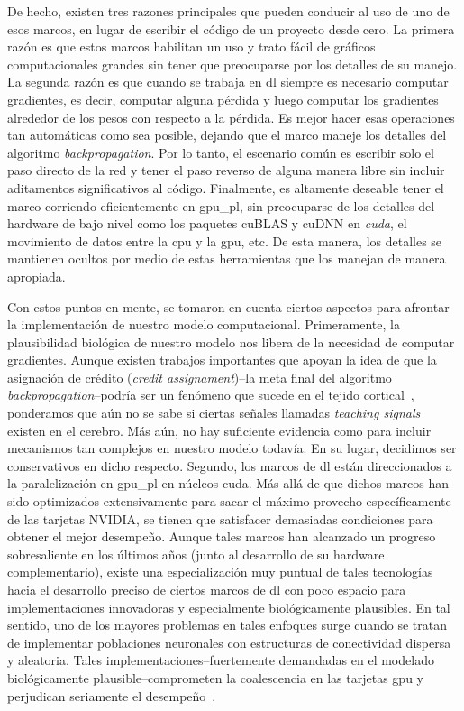{De hecho, existen tres razones principales que pueden conducir al uso de uno de esos marcos, en lugar de escribir el código de un proyecto desde cero.
La primera razón es que estos marcos habilitan un uso y trato fácil de gráficos computacionales grandes sin tener que preocuparse por los detalles de su manejo.
La segunda razón es que cuando se trabaja en \gls{dl} siempre es necesario computar gradientes, es decir, computar alguna pérdida y luego computar los gradientes alrededor de los pesos con respecto a la pérdida.
Es mejor hacer esas operaciones tan automáticas como sea posible, dejando que el marco maneje los detalles del algoritmo \emph{backpropagation}.
Por lo tanto, el escenario común es escribir solo el paso directo de la red y tener el paso reverso de alguna manera libre sin incluir aditamentos significativos al código.
Finalmente, es altamente deseable tener el marco corriendo eficientemente en  \gls{gpu_pl}, sin preocuparse de los detalles del hardware de bajo nivel como los paquetes cuBLAS y cuDNN en \emph{\gls{cuda}}, el movimiento de datos entre la \gls{cpu} y la \gls{gpu}, etc.
De esta manera, los detalles se mantienen ocultos por medio de estas herramientas que los manejan de manera apropiada.

Con estos puntos en mente, se tomaron en cuenta ciertos aspectos para afrontar la implementación de nuestro modelo computacional.
Primeramente, la plausibilidad biológica de  nuestro modelo nos libera de la necesidad de computar gradientes.
Aunque existen trabajos importantes que apoyan la idea de que la asignación de crédito (\emph{credit assignament})--la meta final del algoritmo \emph{backpropagation}--podría ser un fenómeno que sucede en el tejido cortical~\cite{Guerguiev2017TowardsDL}, ponderamos que aún no se sabe si ciertas señales llamadas \emph{teaching signals} existen en el cerebro.
Más aún, no hay suficiente evidencia como para incluir mecanismos tan complejos en nuestro modelo todavía.
En su lugar, decidimos ser conservativos en dicho respecto.
Segundo, los marcos de \gls{dl} están direccionados a la paralelización en \gls{gpu_pl} en núcleos \gls{cuda}.
Más allá de que dichos marcos han sido optimizados extensivamente para sacar el máximo provecho específicamente de las tarjetas NVIDIA, se tienen que satisfacer demasiadas condiciones para obtener el mejor desempeño.
Aunque tales marcos han alcanzado un progreso sobresaliente en los últimos años (junto al desarrollo de su hardware complementario), existe una especialización muy puntual de tales tecnologías hacia el desarrollo preciso de ciertos marcos de \gls{dl} con poco espacio para implementaciones innovadoras y especialmente biológicamente plausibles.
En tal sentido, uno de los mayores problemas en tales enfoques surge cuando se tratan de implementar poblaciones neuronales con estructuras de conectividad dispersa y aleatoria.
Tales implementaciones--fuertemente demandadas en el modelado biológicamente plausible--comprometen la coalescencia en las tarjetas \gls{gpu} y perjudican seriamente el desempeño~\cite{doi:10.3109/0954898X.2012.739292}.

}
